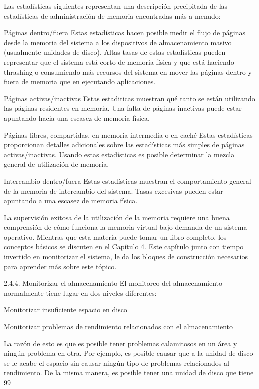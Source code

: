 \documentclass[12pt]{article}
\begin{document}
\begin{itemize}
Las estadísticas siguientes representan una descripción precipitada de las estadísticas de administración de memoria encontradas más a menudo:

Páginas dentro/fuera
Estas estadísticas hacen posible medir el flujo de páginas desde la memoria del sistema a los dispositivos de almacenamiento masivo (usualmente unidades de disco). Altas tasas de estas estadísticas pueden representar que el sistema está corto de memoria física y que está haciendo thrashing o consumiendo más recursos del sistema en mover las páginas dentro y fuera de memoria que en ejecutando aplicaciones.

Páginas activas/inactivas
Estas estaditicas muestran qué tanto se están utilizando las páginas residentes en memoria. Una falta de páginas inactivas puede estar apuntando hacia una escasez de memoria física.

Páginas libres, compartidas, en memoria intermedia o en caché
Estas estadísticas proporcionan detalles adicionales sobre las estadísticas más simples de páginas activas/inactivas. Usando estas estadísticas es posible determinar la mezcla general de utilización de memoria.

Intercambio dentro/fuera
Estas estadísticas muestran el comportamiento general de la memoria de intercambio del sistema. Tasas excesivas pueden estar apuntando a una escasez de memoria física.

La supervisión exitosa de la utilización de la memoria requiere una buena comprensión de cómo funciona la memoria virtual bajo demanda de un sistema operativo. Mientras que esta materia puede tomar un libro completo, los conceptos básicos se discuten en el Capítulo 4. Este capítulo junto con tiempo invertido en monitorizar el sistema, le da los bloques de construcción necesarios para aprender más sobre este tópico.

2.4.4. Monitorizar el almacenamiento
El monitoreo del almacenamiento normalmente tiene lugar en dos niveles diferentes:

Monitorizar insuficiente espacio en disco

Monitorizar problemas de rendimiento relacionados con el almacenamiento

La razón de esto es que es posible tener problemas calamitosos en un área y ningún problema en otra. Por ejemplo, es posible causar que a la unidad de disco se le acabe el espacio sin causar ningún tipo de problemas relacionados al rendimiento. De la misma manera, es posible tener una unidad de disco que tiene 99%


\end{itemize}
\end{document}
